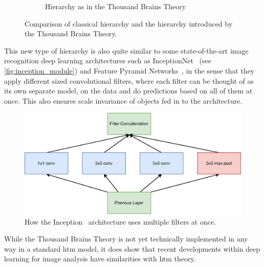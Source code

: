 \begin{figure}[htb]
\begin{subfigure}[t]{0.3\textwidth}
        \caption{Hierarchy as in the Thousand Brains Theory}
        \label{}
    \end{subfigure}
    \caption[Thousand Brains Visualization]{Comparison of classical hierarchy and the hierarchy introduced by the Thousand Brains Theory.}
\end{figure}
\par
This new type of hierarchy is also quite similar to some state-of-the-art image recognition deep learning architectures such as InceptionNet~\cite{inceptionnet} (see \autoref{fig:inception_module}) and Feature Pyramid Networks~\cite{fpn}, in the sense that they apply different sized convolutional filters, where each filter can be thought of as its own separate model, on the data and do predictions based on all of them at once. This also ensures scale invariance of objects fed in to the architecture.
\begin{figure}[htb]
    \centering
    \includegraphics[width=0.9\linewidth]{resources/related_works/inception.eps}
    \caption[Filter Concatenation]{How the Inception~\cite{inceptionnet} architecture uses multiple filters at once.}
    \label{fig:inception_module}
\end{figure}
\par
While the Thousand Brains Theory is not yet technically implemented in any way in a standard \gls*{htm} model, it does show that recent developments within deep learning for image analysis have similarities with \gls*{htm} theory.

